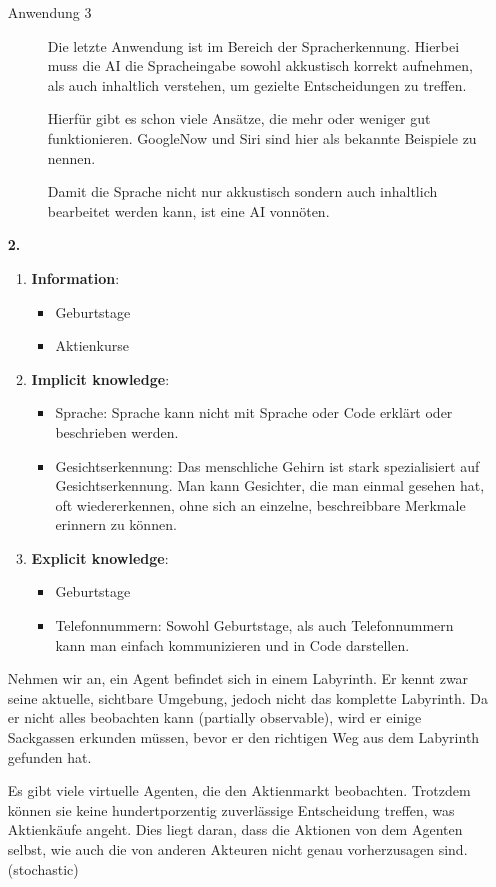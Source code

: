 \documentclass[a4paper,11pt]{article}
\begin{document}
\begin{enumerate}
\begin{description}
    \item[Anwendung 3]
        Die letzte Anwendung ist im Bereich der Spracherkennung. Hierbei muss die AI die Spracheingabe sowohl akkustisch korrekt aufnehmen, als auch inhaltlich verstehen, um gezielte Entscheidungen zu treffen.

        Hierfür gibt es schon viele Ansätze, die mehr oder weniger gut funktionieren.
        GoogleNow und Siri sind hier als bekannte Beispiele zu nennen.

        Damit die Sprache nicht nur akkustisch sondern auch inhaltlich bearbeitet werden kann, ist eine AI vonnöten.

    \end{description}
\newpage
\item[\textbf{2.}]
    

    \begin{enumerate}
    \item \textbf{Information}:
        \begin{itemize}
            \item Geburtstage
            \item Aktienkurse
        \end{itemize}
    \item \textbf{Implicit knowledge}:
        \begin{itemize}
            \item Sprache:
                Sprache kann nicht mit Sprache oder Code erklärt oder beschrieben werden.
            \item Gesichtserkennung:
                Das menschliche Gehirn ist stark spezialisiert auf Gesichtserkennung. Man kann Gesichter, die man einmal gesehen hat, oft wiedererkennen, ohne sich an einzelne, beschreibbare Merkmale erinnern zu können.
        \end{itemize}
    \item \textbf{Explicit knowledge}:
        \begin{itemize}
            \item Geburtstage
            \item Telefonnummern:
            Sowohl Geburtstage, als auch Telefonnummern kann man einfach kommunizieren und in Code darstellen.
        \end{itemize}
    \end{enumerate}

    Nehmen wir an, ein Agent befindet sich in einem Labyrinth. Er kennt zwar seine aktuelle, sichtbare Umgebung, jedoch nicht das komplette Labyrinth. Da er nicht alles beobachten kann (partially observable), wird er einige Sackgassen erkunden müssen, bevor er den richtigen Weg aus dem Labyrinth gefunden hat.

    Es gibt viele virtuelle Agenten, die den Aktienmarkt beobachten. Trotzdem können sie keine hundertporzentig zuverlässige Entscheidung treffen, was Aktienkäufe angeht. Dies liegt daran, dass die Aktionen von dem Agenten selbst, wie auch die von anderen Akteuren nicht genau vorherzusagen sind. (stochastic)
\end{enumerate}
\end{document}
